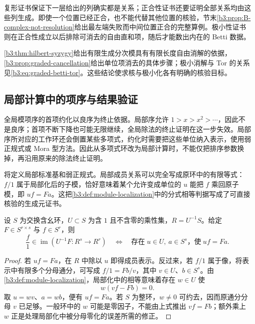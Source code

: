 复形证书保证下一层给出的列确实都是关系；正合性证书还要证明全部关系均由这些列生成。即使一个位置已经正合，也不能代替其他位置的核验，节末\cref{b3:prop:B-complex-not-resolution}给出最左端失败而中间位置正合的完整算例。极小性证书则在正合性成立以后排除可消去的自由直和项，随后才能数出内在的 Betti 数据。

\ProseParagraphBreak
\cref{b3:thm:hilbert-syzygy}给出有限生成分次模具有有限长度自由消解的依据，\cref{b3:prop:graded-cancellation}给出单位项消去的具体步骤；极小消解与 Tor 的关系见\eqref{b3:eq:graded-betti-tor}。这些结论使求核与极小化各有明确的核验目标。

\subsection{局部计算中的项序与结果验证}
\label{b3:subsec:B04:02}

全局模项序的首项约化以良序为终止依据。局部序允许 \(1>x>x^2>\cdots\)，因此不是良序；首项不断下降也可能无限继续，全局除法的终止证明在这一步失效。局部序所对应的工作环还会倒置某些多项式，约化时需要把这些单位纳入表示，使用弱正规式或 Mora 型方法。因此从多项式环改为局部计算时，不能仅把排序参数换掉，再沿用原来的除法终止证明。

\ProseParagraphBreak
{}将定义局部标准基和弱正规式。局部成员关系可以完全写成原环中的有限等式：\(f/1\) 属于局部化后的子模，恰好意味着某个允许变成单位的 \(u\) 能把 \(f\) 乘回原子模，即 \(uf=Fa\)。这把\cref{b3:def:module-localization}中的分式相等判据写成了可直接核验的生成元证书。

\begin{proposition}[局部成员证书]\label{b3:prop:B-local-membership-certificate}
	设 \(S\) 为交换含幺环，\(U\subset S\) 为含 \(1\) 且不含零的乘性集，\(R=U^{-1}S\)。给定 \(F\in S^{r\times s}\) 与 \(f\in S^r\)，则
	\[
		\dfrac{f}{1}\in\operatorname{im}(U^{-1}F:R^s\longrightarrow R^r) \quad\Longleftrightarrow\quad \text{存在}\;u\in U,\ a\in S^s\text{，使}\;uf=Fa.
	\]
\end{proposition}
\begin{proof}
	若 \(uf=Fa\)，在 \(R\) 中除以 \(u\) 即得成员表示。反过来，若 \(f/1\) 属于像，将表示中有限多个分母通分，可写成 \(f/1=Fb/v\)，其中 \(v\in U\)、\(b\in S^s\)。由\cref{b3:def:module-localization}，局部化中的相等意味着存在 \(w\in U\) 使
	\[
		w(vf-Fb)=0.
	\]
	取 \(u=wv\)、\(a=wb\)，便有 \(uf=Fa\)。若 \(S\) 为整环，\(w\ne0\) 可约去，因而原通分分母 \(v\) 已足够。一般环中的 \(w\) 可能是零因子，不能由上式推出 \(vf=Fb\)；额外乘上 \(w\) 正是处理局部化中被分母零化的误差所需的修正。
\end{proof}

